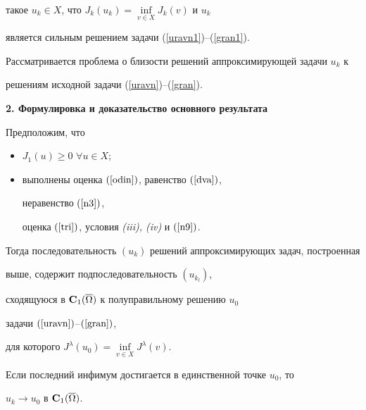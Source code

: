 такое $u_k\in X$, что $J_k(u_k)=\inf\limits_{v\in X}J_k(v)$ и $u_k$


является сильным решением задачи (\ref{uravn1})--(\ref{gran1}).





Рассматривается проблема о близости решений аппроксимирующей задачи $u_k$ к


решениям исходной задачи (\ref{uravn})--(\ref{gran}).


\addtocounter{section}{1}


\setcounter{thms}{0}


\medskip





{\bf 2. Формулировка и доказательство основного результата}





\begin{thms}


Предположим, что


\begin{itemize}


\item[1)] $J_1(u)\geq 0$ $\forall u\in X;$


\item[2)] выполнены оценка $(\ref{odin})$, равенство $(\ref{dva})$,


неравенство $(\ref{n3})$,


оценка $(\ref{tri})$, условия {\em (iii), (iv)} и $(\ref{n9})$.


\end{itemize}





Тогда последовательность $(u_k)$ решений аппроксимирующих задач, построенная


выше, содержит подпоследовательность $(u_{k_l})$,


сходящуюся в ${\bold C}_1(\overline{\Omega})$ к полуправильному решению $u_0$


задачи $(\ref{uravn})$--$(\ref{gran})$,


для которого $J^{\lambda}(u_0)=\inf\limits_{v\in X}J^{\lambda}(v)$.


Если последний инфимум достигается в единственной точке $u_0$, то


$u_k\to u_0$ в ${\bold C}_1(\overline{\Omega})$.


\label{t5}


\end{thms}








